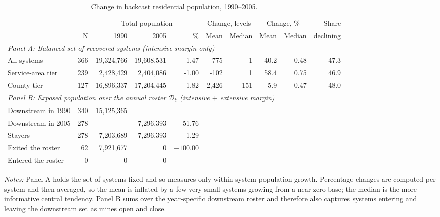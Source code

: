 \begin{table}[ht]
\centering
\caption{Change in backcast residential population, 1990--2005.}
\label{tab:backcast_change}
\begin{adjustbox}{max width=\textwidth}
\begin{tabular}{lrrrrrrrrr}
\toprule
& & \multicolumn{3}{c}{Total population} & \multicolumn{2}{c}{Change, levels} & \multicolumn{2}{c}{Change, \%} & Share \\
\cmidrule(lr){3-5}\cmidrule(lr){6-7}\cmidrule(lr){8-9}
& N & 1990 & 2005 & \% & Mean & Median & Mean & Median & declining \\
\midrule
\multicolumn{10}{l}{\textit{Panel A: Balanced set of recovered systems (intensive margin only)}} \\
All systems & 366 & 19,324,766 & 19,608,531 & 1.47 & 775 & 1 & 40.2 & 0.48 & 47.3 \\
\quad Service-area tier & 239 & 2,428,429 & 2,404,086 & -1.00 & -102 & 1 & 58.4 & 0.75 & 46.9 \\
\quad County tier & 127 & 16,896,337 & 17,204,445 & 1.82 & 2,426 & 151 & 5.9 & 0.47 & 48.0 \\
\midrule
\multicolumn{10}{l}{\textit{Panel B: Exposed population over the annual roster $\mathcal{D}_t$ (intensive $+$ extensive margin)}} \\
Downstream in 1990 & 340 & 15,125,365 & & & & & & & \\
Downstream in 2005 & 278 & & 7,296,393 & -51.76 & & & & & \\
\quad Stayers & 278 & 7,203,689 & 7,296,393 & 1.29 & & & & & \\
\quad Exited the roster & 62 & 7,921,677 & 0 & $-100.00$ & & & & & \\
\quad Entered the roster & 0 & 0 & 0 & & & & & & \\
\bottomrule
\end{tabular}
\end{adjustbox}
\begin{minipage}{\textwidth}\footnotesize
\vspace{0.5em}
\textit{Notes:} Panel A holds the set of systems fixed and so measures only within-system population growth. Percentage changes are computed per system and then averaged, so the mean is inflated by a few very small systems growing from a near-zero base; the median is the more informative central tendency. Panel B sums over the year-specific downstream roster and therefore also captures systems entering and leaving the downstream set as mines open and close.
\end{minipage}
\end{table}
